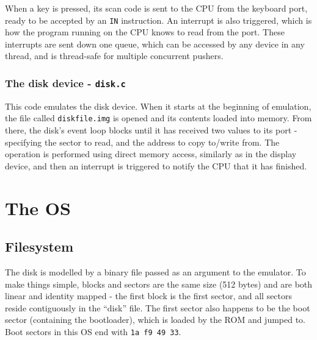 \documentclass[12pt,a4paper]{report}
\begin{document}
When a key is pressed, its scan code is sent to the CPU from the keyboard port, ready to be accepted by an \texttt{IN} instruction. An interrupt is also triggered, which is how the program running on the CPU knows to read from the port. These interrupts are sent down one queue, which can be accessed by any device in any thread, and is thread-safe for multiple concurrent pushers.

\subsection*{The disk device - \texttt{disk.c}}

This code emulates the disk device. When it starts at the beginning of emulation, the file called \texttt{diskfile.img} is opened and its contents loaded into memory. From there, the disk's event loop blocks until it has received two values to its port - specifying the sector to read, and the address to copy to/write from. The operation is performed using direct memory access, similarly as in the display device, and then an interrupt is triggered to notify the CPU that it has finished.


\chapter{The OS}

\section{Filesystem}

The disk is modelled by a binary file passed as an argument to the emulator. To make things simple, blocks and sectors are the same size (512 bytes) and are both linear and identity mapped - the first block is the first sector, and all sectors reside contiguously in the ``disk'' file. The first sector also happens to be the boot sector (containing the bootloader), which is loaded by the ROM and jumped to. Boot sectors in this OS end with \texttt{1a f9 49 33}.
\end{document}
